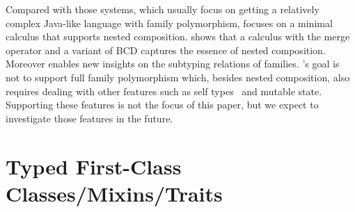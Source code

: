 












Compared with those systems, which usually focus on getting
a relatively complex Java-like language with family polymorphism,
\namee focuses on a minimal calculus that supports
nested composition. \namee shows that a calculus with the merge
operator and a variant of BCD captures the
essence of nested composition. Moreover \namee enables new insights
on the subtyping relations of families.
 \namee's goal is not to support full family
polymorphism which, besides nested composition, also requires
dealing with other features such as
self types~\citep{bruce95thistype,saito09matching} and mutable state. Supporting these features is not the
focus of this paper, but we expect to investigate those features in the future.



\section{Typed First-Class Classes/Mixins/Traits}

